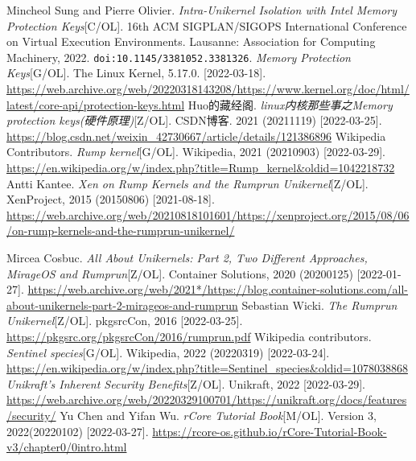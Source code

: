 \documentclass[UTF8,fontset=none,linespread=1.15]{ctexart}
\begin{document}
\begin{thebibliography}{99}
 Mincheol Sung and Pierre Olivier. \textit{Intra-Unikernel Isolation with Intel Memory Protection Keys}[C/OL]. 16th ACM SIGPLAN/SIGOPS International Conference on Virtual Execution Environments. Lausanne: Association for Computing Machinery, 2022. \texttt{doi:10.1145/3381052.3381326}.
 \textit{Memory Protection Keys}[G/OL]. The Linux Kernel, 5.17.0. [2022-03-18]. \url{https://web.archive.org/web/20220318143208/https://www.kernel.org/doc/html/latest/core-api/protection-keys.html}
 Huo的藏经阁. \textit{linux内核那些事之Memory protection keys(硬件原理)}[Z/OL]. CSDN博客. 2021 (20211119) [2022-03-25]. \url{https://blog.csdn.net/weixin_42730667/article/details/121386896}
 Wikipedia Contributors. \textit{Rump kernel}[G/OL]. Wikipedia, 2021 (20210903) [2022-03-29]. \url{https://en.wikipedia.org/w/index.php?title=Rump_kernel&oldid=1042218732}
 Antti Kantee. \textit{Xen on Rump Kernels and the Rumprun Unikernel}[Z/OL]. XenProject, 2015 (20150806) [2021-08-18].  \url{https://web.archive.org/web/20210818101601/https://xenproject.org/2015/08/06/on-rump-kernels-and-the-rumprun-unikernel/}

 Mircea Cosbuc. \textit{All About Unikernels: Part 2, Two Different Approaches, MirageOS and Rumprun}[Z/OL]. Container Solutions, 2020 (20200125) [2022-01-27]. \url{https://web.archive.org/web/2021*/https://blog.container-solutions.com/all-about-unikernels-part-2-mirageos-and-rumprun}
 Sebastian Wicki. \textit{The Rumprun Unikernel}[Z/OL]. pkgsrcCon, 2016
[2022-03-25]. \url{https://pkgsrc.org/pkgsrcCon/2016/rumprun.pdf}
 Wikipedia contributors. \textit{Sentinel species}[G/OL]. Wikipedia, 2022 (20220319) [2022-03-24]. \url{https://en.wikipedia.org/w/index.php?title=Sentinel_species&oldid=1078038868}
 \textit{Unikraft's Inherent Security Benefits}[Z/OL]. Unikraft, 2022 [2022-03-29]. \url{https://web.archive.org/web/20220329100701/https://unikraft.org/docs/features/security/}
 Yu Chen and Yifan Wu. \textit{rCore Tutorial Book}[M/OL]. Version 3,
2022(20220102) [2022-03-27]. \url{https://rcore-os.github.io/rCore-Tutorial-Book-v3/chapter0/0intro.html}
\end{thebibliography}
\end{document}
